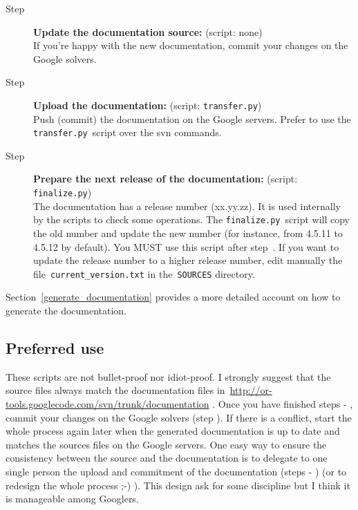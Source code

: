 \documentclass[a4paper,10pt]{article}
\newcommand{\code}[1]{\texttt{#1}}
\begin{document}
\begin{description}
 \item[Step ] {\bf Update the documentation source:} (script: none)\\If you're happy with the new documentation, commit your changes on the Google solvers. 
 \item[Step ] {\bf Upload the documentation:} (script: \code{transfer.py})\\Push (commit) the documentation on the Google servers. Prefer to use the \code{transfer.py}~script over the svn commands.
 \item[Step ] {\bf Prepare the next release of the documentation:} (script: \code{finalize.py})\\The documentation has a release number (xx.yy.zz). It is used internally by the scripts to check some operations. The \code{finalize.py}~script will copy the old number and update the new number (for instance, from 4.5.11 to 4.5.12 by default). You MUST use this script after step~. If you want to update the release number to a higher release number, edit manually the file~\code{current\_version.txt} in the~\code{SOURCES} directory.
\end{description}

Section~\ref{generate_documentation} provides a more detailed account on how to generate the documentation.


\subsection{Preferred use}

These scripts are not bullet-proof nor idiot-proof. I strongly suggest that the source files always match the documentation files in~\href{http://or-tools.googlecode.com/svn/trunk/documentation}{http://or-tools.googlecode.com/svn/trunk/documentation} . Once you have finished steps  - , commit your changes on the Google solvers (step ). If there is a conflict, start the whole process again later when the generated documentation is up to date and matches the sources files on the Google servers. One easy way to ensure the consistency between the source and the documentation is to delegate to one single person the upload and commitment of the documentation (steps  - ) (or to redesign the whole process ;-) ). This design ask for some discipline but I think it is manageable among Googlers.
\end{document}
